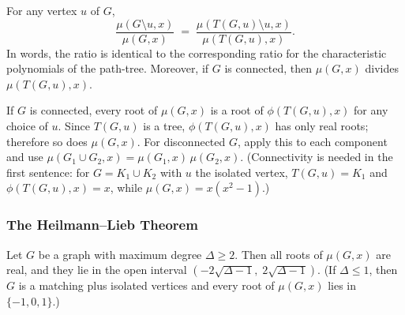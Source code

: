 \begin{theorem}\label{thm:pathtree}
For any vertex $u$ of $G$,
\[
  \frac{\mu(G \setminus u, x)}{\mu(G, x)}
  \;=\; \frac{\mu(T(G, u) \setminus u, x)}{\mu(T(G, u), x)}.
\]
In words, the ratio is identical to the corresponding ratio for the
characteristic polynomials of the path-tree. Moreover, if $G$ is
connected, then $\mu(G, x)$ divides $\mu(T(G, u), x)$.
\end{theorem}

\begin{corollary}\label{cor:rootreduce}
If $G$ is connected, every root of $\mu(G, x)$ is a root of
$\phi(T(G, u), x)$ for any choice of $u$. Since $T(G, u)$ is a tree,
$\phi(T(G, u), x)$ has only real roots; therefore so does
$\mu(G, x)$. For disconnected $G$, apply this to each component and
use $\mu(G_1 \cup G_2, x) = \mu(G_1, x)\,\mu(G_2, x)$. (Connectivity
is needed in the first sentence: for $G = K_1 \cup K_2$ with $u$ the
isolated vertex, $T(G, u) = K_1$ and $\phi(T(G, u), x) = x$, while
$\mu(G, x) = x(x^2 - 1)$.)
\end{corollary}

\subsubsection{The Heilmann--Lieb Theorem}

\begin{theorem}\label{thm:hl}
Let $G$ be a graph with maximum degree $\Delta \ge 2$. Then all roots of
$\mu(G, x)$ are real, and they lie in the open interval
$(-2\sqrt{\Delta - 1},\; 2\sqrt{\Delta - 1})$. (If $\Delta \le 1$, then
$G$ is a matching plus isolated vertices and every root of $\mu(G, x)$
lies in $\{-1, 0, 1\}$.)
\end{theorem}

